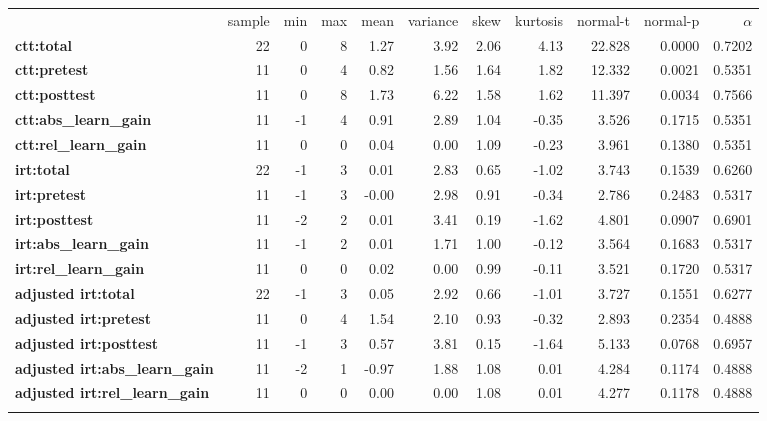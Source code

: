 \documentclass[]{article}
\begin{document}
\begin{longtable}[c]{@{}lrrrrrrrrrr@{}}
\toprule\addlinespace
& sample & min & max & mean & variance & skew & kurtosis & normal-t &
normal-p & $\alpha$
\\\addlinespace
\midrule\endhead
\textbf{ctt:total} & 22 & 0 & 8 & 1.27 & 3.92 & 2.06 & 4.13 & 22.828 &
0.0000 & 0.7202
\\\addlinespace
\textbf{ctt:pretest} & 11 & 0 & 4 & 0.82 & 1.56 & 1.64 & 1.82 & 12.332 &
0.0021 & 0.5351
\\\addlinespace
\textbf{ctt:posttest} & 11 & 0 & 8 & 1.73 & 6.22 & 1.58 & 1.62 & 11.397
& 0.0034 & 0.7566
\\\addlinespace
\textbf{ctt:abs\_learn\_gain} & 11 & -1 & 4 & 0.91 & 2.89 & 1.04 & -0.35
& 3.526 & 0.1715 & 0.5351
\\\addlinespace
\textbf{ctt:rel\_learn\_gain} & 11 & 0 & 0 & 0.04 & 0.00 & 1.09 & -0.23
& 3.961 & 0.1380 & 0.5351
\\\addlinespace
\textbf{irt:total} & 22 & -1 & 3 & 0.01 & 2.83 & 0.65 & -1.02 & 3.743 &
0.1539 & 0.6260
\\\addlinespace
\textbf{irt:pretest} & 11 & -1 & 3 & -0.00 & 2.98 & 0.91 & -0.34 & 2.786
& 0.2483 & 0.5317
\\\addlinespace
\textbf{irt:posttest} & 11 & -2 & 2 & 0.01 & 3.41 & 0.19 & -1.62 & 4.801
& 0.0907 & 0.6901
\\\addlinespace
\textbf{irt:abs\_learn\_gain} & 11 & -1 & 2 & 0.01 & 1.71 & 1.00 & -0.12
& 3.564 & 0.1683 & 0.5317
\\\addlinespace
\textbf{irt:rel\_learn\_gain} & 11 & 0 & 0 & 0.02 & 0.00 & 0.99 & -0.11
& 3.521 & 0.1720 & 0.5317
\\\addlinespace
\textbf{adjusted irt:total} & 22 & -1 & 3 & 0.05 & 2.92 & 0.66 & -1.01 &
3.727 & 0.1551 & 0.6277
\\\addlinespace
\textbf{adjusted irt:pretest} & 11 & 0 & 4 & 1.54 & 2.10 & 0.93 & -0.32
& 2.893 & 0.2354 & 0.4888
\\\addlinespace
\textbf{adjusted irt:posttest} & 11 & -1 & 3 & 0.57 & 3.81 & 0.15 &
-1.64 & 5.133 & 0.0768 & 0.6957
\\\addlinespace
\textbf{adjusted irt:abs\_learn\_gain} & 11 & -2 & 1 & -0.97 & 1.88 &
1.08 & 0.01 & 4.284 & 0.1174 & 0.4888
\\\addlinespace
\textbf{adjusted irt:rel\_learn\_gain} & 11 & 0 & 0 & 0.00 & 0.00 & 1.08
& 0.01 & 4.277 & 0.1178 & 0.4888
\\\addlinespace
\bottomrule
\end{longtable}
\end{document}
